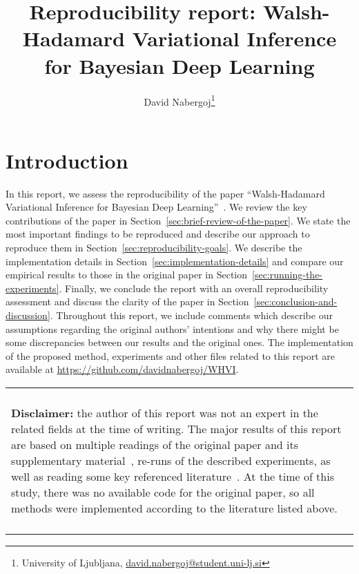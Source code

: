 \documentclass[11pt]{article}
\title{Reproducibility report: Walsh-Hadamard Variational Inference for Bayesian Deep Learning}
\author{David Nabergoj\thanks{University of Ljubljana, \href{mailto:david.nabergoj@student.uni-lj.si}{david.nabergoj@student.uni-lj.si}}}
\newenvironment{disclaimer}
    {
    \begin{center}
    \begin{tabular}{|p{0.9\hsize}|}
    \hline\\
    \begin{footnotesize}\textbf{Disclaimer:}}
    {
    \end{footnotesize}
    \\\\\hline
    \end{tabular}
    \end{center}
    }
\begin{document}
    \maketitle


    \section{Introduction}\label{sec:introduction}
    In this report, we assess the reproducibility of the paper ``Walsh-Hadamard Variational Inference for Bayesian Deep Learning''~\cite{rossi2019walsh}.
    We review the key contributions of the paper in Section~\ref{sec:brief-review-of-the-paper}.
    We state the most important findings to be reproduced and describe our approach to reproduce them in Section~\ref{sec:reproducibility-goals}.
    We describe the implementation details in Section~\ref{sec:implementation-details} and compare our empirical results to those in the original paper in Section~\ref{sec:running-the-experiments}.
    Finally, we conclude the report with an overall reproducibility assessment and discuss the clarity of the paper in Section~\ref{sec:conclusion-and-discussion}.
    Throughout this report, we include comments which describe our assumptions regarding the original authors' intentions and why there might be some discrepancies between our results and the original ones.
    The implementation of the proposed method, experiments and other files related to this report are available at \url{https://github.com/davidnabergoj/WHVI}.

    \begin{disclaimer}
    the author of this report was not an expert in the related fields at the time of writing.
    The major results of this report are based on multiple readings of the original paper and its supplementary material~\cite{rossi2019walsh}, re-runs of the described experiments, as well as reading some key referenced literature~\cite{le2014fastfood, blundell2015weight, fino1976unified, kingma2015variational}.
    At the time of this study, there was no available code for the original paper, so all methods were implemented according to the literature listed above.
    \end{disclaimer}
\end{document}
